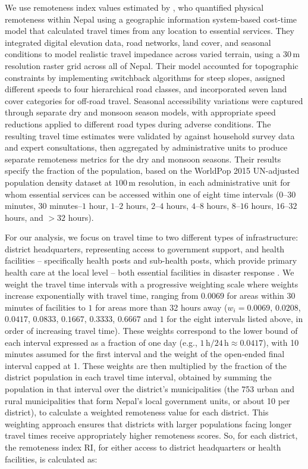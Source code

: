 \documentclass[preprint,12pt,authoryear]{elsarticle}
\begin{document}
We use remoteness index values estimated by \cite{banick2019}, who quantified physical remoteness within Nepal using a geographic information system-based cost-time model that calculated travel times from any location to essential services. They integrated digital elevation data, road networks, land cover, and seasonal conditions to model realistic travel impedance across varied terrain, using a $30\,\text{m}$ resolution raster grid across all of Nepal. Their model accounted for topographic constraints by implementing switchback algorithms for steep slopes, assigned different speeds to four hierarchical road classes, and incorporated seven land cover categories for off-road travel. Seasonal accessibility variations were captured through separate dry and monsoon season models, with appropriate speed reductions applied to different road types during adverse conditions. The resulting travel time estimates were validated by \cite{banick2019} against household survey data and expert consultations, then aggregated by administrative units to produce separate remoteness metrics for the dry and monsoon seasons. Their results specify the fraction of the population, based on the WorldPop 2015 UN-adjusted population density dataset at $100\,\text{m}$ resolution, in each administrative unit for whom essential services can be accessed within one of eight time intervals ($0$--$30$ minutes, $30$ minutes--$1$ hour, $1$--$2$ hours, $2$--$4$ hours, $4$--$8$ hours, $8$--$16$ hours, $16$--$32$ hours, and $>32$ hours).

For our analysis, we focus on travel time to two different types of infrastructure: district headquarters, representing access to government support, and health facilities -- specifically health posts and sub-health posts, which provide primary health care at the local level -- both essential facilities in disaster response \citep{NationalPlanningCommission2015}. We weight the travel time intervals with a progressive weighting scale where weights increase exponentially with travel time, ranging from $0.0069$ for areas within 30 minutes of facilities to $1$ for areas more than 32 hours away ($w_i = 0.0069$, $0.0208$, $0.0417$, $0.0833$, $0.1667$, $0.3333$, $0.6667$ and $1$ for the eight intervals listed above, in order of increasing travel time). These weights correspond to the lower bound of each interval expressed as a fraction of one day (e.g., $1\,\text{h}/24\,\text{h} \approx 0.0417$), with 10 minutes assumed for the first interval and the weight of the open-ended final interval capped at 1. These weights are then multiplied by the fraction of the district population in each travel time interval, obtained by summing the population in that interval over the district's municipalities (the 753 urban and rural municipalities that form Nepal's local government units, or about 10 per district), to calculate a weighted remoteness value for each district. This weighting approach ensures that districts with larger populations facing longer travel times receive appropriately higher remoteness scores. So, for each district, the remoteness index $\text{RI}$, for either access to district headquarters or health facilities, is calculated as:
\end{document}
